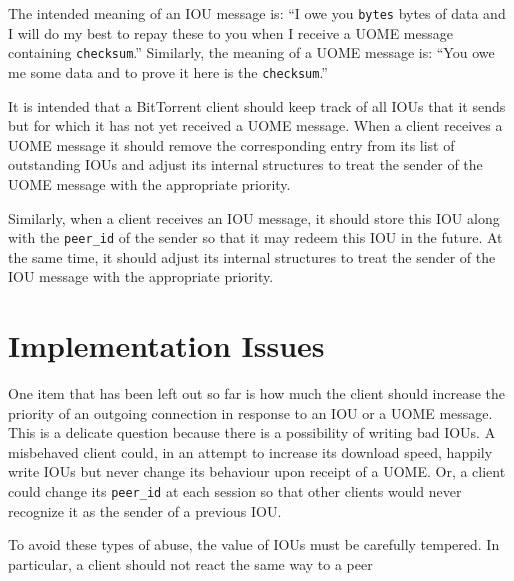 \documentclass[lotsofwhite]{patmorin}
\newcommand{\field}[1]{\texttt{#1}}
\begin{document}
The intended meaning of an IOU message is:  ``I owe you \field{bytes}
bytes of data and I will do my best to repay these to you when I
receive a UOME message containing \field{checksum}.''  Similarly, the
meaning of a UOME message is:  ``You owe me some data and to prove it
here is the \field{checksum}.''

It is intended that a BitTorrent client should keep track of all IOUs
that it sends but for which it has not yet received a UOME message.
When a client receives a UOME message it should remove the
corresponding entry from its list of outstanding IOUs and adjust its
internal structures to treat the sender of the UOME message with the
appropriate priority.

Similarly, when a client receives an IOU message, it should store this
IOU along with the \field{peer\_id} of the sender so that it may
redeem this IOU in the future.  At the same time, it should adjust its
internal structures to treat the sender of the IOU message with the
appropriate priority.

\section{Implementation Issues}

One item that has been left out so far is how much the client should
increase the priority of an outgoing connection in response to an IOU
or a UOME message.  This is a delicate question because there is a
possibility of writing bad IOUs.  A misbehaved client could, in an
attempt to increase its download speed, happily write IOUs but never
change its behaviour upon receipt of a UOME.  Or, a client could
change its \field{peer\_id} at each session so that other clients
would never recognize it as the sender of a previous IOU.

To avoid these types of abuse, the value of IOUs must be carefully
tempered.  In particular, a client should not react the same way to a
peer
\end{document}
